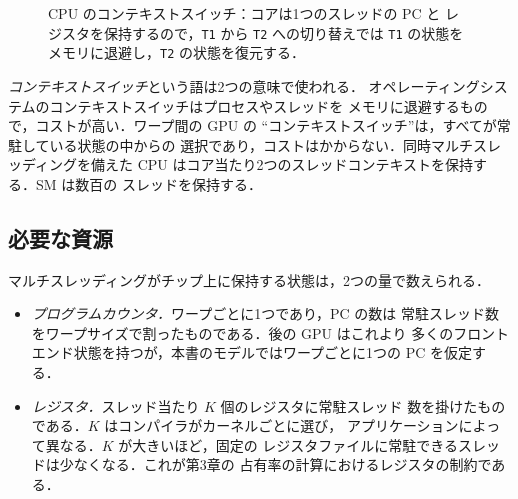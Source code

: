 \documentclass[../main.tex]{subfiles}
\begin{document}
\begin{figure}[htbp]
  \centering
  
  \caption{CPU のコンテキストスイッチ：コアは1つのスレッドの PC と
    レジスタを保持するので，\texttt{T1} から \texttt{T2} への切り替えでは
    \texttt{T1} の状態をメモリに退避し，\texttt{T2} の状態を復元する．}
  \label{fig:l04-context-switch}
\end{figure}

\begin{note}
  \emph{コンテキストスイッチ}という語は2つの意味で使われる．
  オペレーティングシステムのコンテキストスイッチはプロセスやスレッドを
  メモリに退避するもので，コストが高い．ワープ間の GPU の
  \enquote{コンテキストスイッチ}は，すべてが常駐している状態の中からの
  選択であり，コストはかからない．同時マルチスレッディングを備えた
  CPU はコア当たり2つのスレッドコンテキストを保持する．SM は数百の
  スレッドを保持する．
\end{note}

\subsection{必要な資源}

マルチスレッディングがチップ上に保持する状態は，2つの量で数えられる．
\begin{itemize}
  \item \emph{プログラムカウンタ．}ワープごとに1つであり，PC の数は
    常駐スレッド数をワープサイズで割ったものである．後の GPU はこれより
    多くのフロントエンド状態を持つが，本書のモデルではワープごとに1つの
    PC を仮定する．
  \item \emph{レジスタ．}スレッド当たり $K$ 個のレジスタに常駐スレッド
    数を掛けたものである．$K$ はコンパイラがカーネルごとに選び，
    アプリケーションによって異なる．$K$ が大きいほど，固定の
    レジスタファイルに常駐できるスレッドは少なくなる．これが第3章の
    占有率の計算におけるレジスタの制約である．
\end{itemize}
\end{document}
